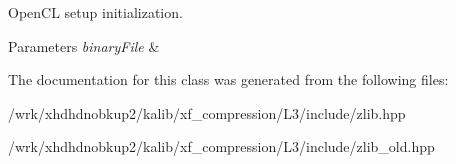 Open\-C\-L setup initialization. 


\begin{DoxyParams}{Parameters}
{\em binary\-File} & \\
\hline
\end{DoxyParams}


The documentation for this class was generated from the following files\-:\begin{DoxyCompactItemize}
\item 
/wrk/xhdhdnobkup2/kalib/xf\-\_\-compression/\-L3/include/zlib.\-hpp\item 
/wrk/xhdhdnobkup2/kalib/xf\-\_\-compression/\-L3/include/zlib\-\_\-old.\-hpp\end{DoxyCompactItemize}
